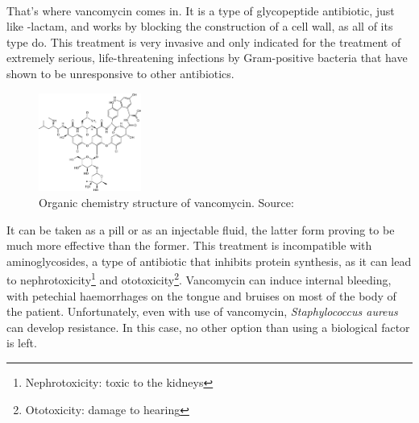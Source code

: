 \paragraph{}That's where vancomycin comes in. It is a type of glycopeptide antibiotic, just like \beta-lactam, and works by blocking the construction of a cell wall, as all of its type do. This treatment is very invasive and only indicated for the treatment of extremely serious, life-threatening infections by Gram-positive bacteria that have shown to be unresponsive to other antibiotics.\begin{figure}\begin{center}\includegraphics[width=0.30\textwidth]{assets/vancomycin.png}\end{center}\caption{Organic chemistry structure of vancomycin. Source: \cite{FileVancomycinSvg2008}}\vspace{0.15\linewidth}\end{figure}\newline It can be taken as a pill or as an injectable fluid, the latter form proving to be much more effective than the former. This treatment is incompatible with aminoglycosides, a type of antibiotic that inhibits protein synthesis, as it can lead to nephrotoxicity\footnote{Nephrotoxicity: toxic to the kidneys} and ototoxicity\footnote{Ototoxicity: damage to hearing}. Vancomycin can induce  internal bleeding, with petechial haemorrhages on the tongue and bruises on most of the body of the patient. Unfortunately, even with use of vancomycin, \emph{Staphylococcus aureus} can develop resistance. In this case, no other option than using a biological factor is left.
